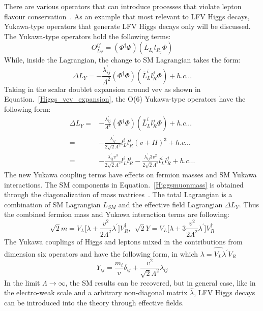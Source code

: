 There are various operators that can introduce processes that violate lepton flavour conservation~\cite{PhysRevD.62.116005}. As an example that most relevant to LFV Higgs decays, Yukawa-type operators that generate LFV Higgs decays only will be discussed. The Yukawa-type operators hold the following terms:
\begin{equation}
O^{ij}_{L\phi}=(\Phi^{\dagger}\Phi)(\bar{L}_{L_{i}}l_{R_{j}}\Phi)
\end{equation}
While, inside the Lagrangian, the change to SM Lagrangian takes the form:
\begin{equation}
\Delta L_{Y}=-\frac{\lambda^{'}_{ij}}{\Lambda^{2}}(\Phi^{\dagger}\Phi)(\bar{L}^{i}_{L}l^{j}_{R}\Phi)+h.c...
\end{equation}
Taking in the scalar doublet expansion around vev as shown in Equation.~\ref{Higgs_vev_expansion}, the O(6) Yukawa-type operators have the following form:
\begin{equation}
\begin{aligned}
\Delta L_{Y}=&-\frac{\lambda^{'}_{ij}}{\Lambda^{2}}(\Phi^{\dagger}\Phi)(\bar{L}^{i}_{L}l^{j}_{R}\Phi)+h.c...\\
         =&-\frac{\lambda^{'}_{ij}}{2\sqrt{2}\Lambda^{2}}l_{L}^{i}l_{R}^{j}(v+H)^{3}+h.c...\\
         =&-\frac{\lambda^{'}_{ij}v^{3}}{2\sqrt{2}\Lambda^{2}}l_{L}^{i}l_{R}^{j}-\frac{\lambda^{'}_{ij}3v^{2}}{2\sqrt{2}\Lambda^{2}}l_{L}^{i}l_{R}^{j}+h.c...
\end{aligned}
\end{equation}
The new Yukawa coupling terms have effects on fermion masses and SM Yukawa interactions. The SM components in Equation.~\ref{Higgsmuonmass} is obtained through the diagonalization of mass matrices~\cite{Harnik:2012pb}. The total Lagrangian is a combination of SM Lagrangian $L_{SM}$ and the effective field Lagrangian $\Delta L_{Y}$. Thus the combined fermion mass and Yukawa interaction terms are following:
\begin{equation}
\sqrt{2}m=V_{L}\Big[\lambda+\frac{v^{2}}{2\Lambda^{2}}\lambda^{'}\Big]V^{\dagger}_{R},~~\sqrt{2}Y=V_{L}\Big[\lambda+3\frac{v^{2}}{2\Lambda^{2}}\lambda^{'}\Big]V^{\dagger}_{R}
\end{equation}
The Yukawa couplings of Higgs and leptons mixed in the contributions from dimension six operators and have the following form, in which $\hat{\lambda=V_{L}\lambda^{'}V_{R}}$
\begin{equation}
Y_{ij}=\frac{m_{i}}{v}\delta_{ij}+\frac{v^{2}}{\sqrt{2}\Lambda^{2}}\hat{\lambda}_{ij}
\end{equation}
In the limit $\Lambda \to \infty$, the SM results can be recovered, but in general case, like in the electro-weak scale and a arbitrary non-diagonal matrix $\hat{\lambda}$, LFV Higgs decays can be introduced into the theory through effective fields.




